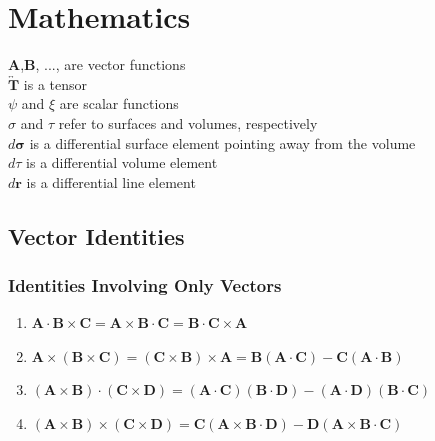 \chapter{Mathematics}
\noindent
\textbf{A},\textbf{B}, ..., are vector functions\\
$\overleftrightarrow{\textbf{T}}$ is a tensor \\
$\psi$ and $\xi$ are scalar functions\\
$\sigma$ and $\tau$ refer to surfaces and volumes, respectively\\
$d\boldsymbol{\sigma}$ is a differential surface element pointing away from the volume\\
$d\tau$ is a differential volume element\\
$d\boldsymbol{r}$ is a differential line element\\
\section{Vector Identities}

\subsection{Identities Involving Only Vectors }
\renewcommand{\labelenumi}{(\alph{enumi})}
\begin{enumerate}
  \item{$\textbf{A}\cdot\textbf{B}\times\textbf{C} = \textbf{A}\times\textbf{B}\cdot\textbf{C} = \textbf{B}\cdot\textbf{C}\times\textbf{A}$}
  \item{$\textbf{A}\times(\textbf{B}\times\textbf{C}) = (\textbf{C}\times\textbf{B})\times\textbf{A} = \textbf{B}(\textbf{A}\cdot\textbf{C}) - \textbf{C}(\textbf{A}\cdot\textbf{B})$}
  \item{$(\textbf{A}\times\textbf{B})\cdot(\textbf{C}\times\textbf{D}) = (\textbf{A}\cdot\textbf{C})(\textbf{B}\cdot\textbf{D}) - (\textbf{A}\cdot\textbf{D})(\textbf{B}\cdot\textbf{C})$}
  \item{$(\textbf{A}\times\textbf{B})\times(\textbf{C}\times\textbf{D})= \textbf{C}(\textbf{A}\times\textbf{B}\cdot\textbf{D}) - \textbf{D}(\textbf{A}\times\textbf{B}\cdot\textbf{C})$}
\end{enumerate}

